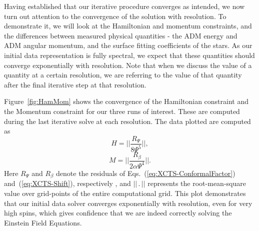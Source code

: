 \documentclass[aps,prd,amsmath,floatfix
,twocolumn
,superscriptaddress,nofootinbib,showpacs]{revtex4-1}
\theoremstyle{plain} \newtheorem{thm}{Theorem} \newtheorem{lem}{Lemma}
\newcommand{\red}[1]{\textcolor{Red}{#1}}
\newcommand{\harald}[1]{{\textcolor{OliveGreen}{#1}}} %
\newcommand{\roland}[1]{\textcolor{Magenta}{\textit{ROLAND: #1}}}
\begin{document}
Having established that our iterative procedure converges as intended,
we now turn out attention to the convergence of the solution with
resolution. To demonstrate it, we will look at the Hamiltonian and
momentum constraints, and the differences between measured physical
quantities - the ADM energy and ADM angular momentum, and the surface
fitting coefficients of the stars. As our initial data representation
is fully spectral, we expect that these quantities should converge
exponentially with resolution. Note that when we discuss the value of
a quantity at a certain resolution, we are referring to the value of
that quantity after the final iterative step at that
resolution.  


Figure~\ref{fig:HamMom} shows the convergence of the Hamiltonian
constraint and the Momentum constraint for our three runs of
interest.  These are computed during the last iterative solve at each
resolution.  The data plotted are computed as
\begin{equation}
H = ||\frac{R_\Psi}{8\Psi^5}||,
\end{equation}
\begin{equation}
M = ||\frac{R_{\beta}}{2\alpha\Psi^4}||.
\end{equation}
Here $R_\Psi$ and $R_\beta$ denote the residuals of Eqs.~(\ref{eq:XCTS-ConformalFactor}) and~(\ref{eq:XCTS-Shift}), respectively
, and $||\,.\,||$ represents the \harald{root-mean-square value over grid-points of} the
 entire computational grid. 
This plot demonstrates that our initial
data solver converges  exponentially with resolution, even for
very high spins, which gives confidence that we are indeed correctly
solving the Einstein Field Equations.
\end{document}
